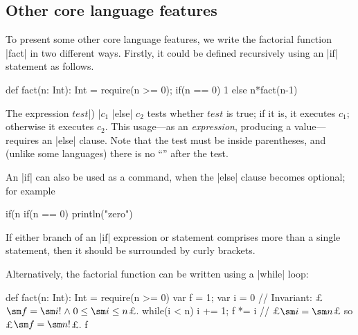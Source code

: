 
\subsection{Other core language features}

To present some other core language features, we write the factorial function
|fact| in two different ways.  Firstly, it could be defined recursively using
an |if| statement as follows.
%
\begin{scala}
  def fact(n: Int): Int = { require(n >= 0); if(n == 0) 1 else n*fact(n-1) }
\end{scala}


The expression
$test$|) |$c_1$ |else| $c_2$
tests whether $test$ is true; if it is, it executes $c_1$; otherwise it
executes $c_2$.
%
This usage---as an \emph{expression}, producing a value---requires an |else|
clause.  Note that the test must be inside parentheses, and (unlike some
languages) there is no ``'' after the test.

An |if| can also be used as a command, when the |else| clause becomes
optional; for example
\begin{scala}
  if(n%
  if(n == 0) println("zero")
\end{scala}


If either branch of an |if| expression or statement comprises more than a
single statement, then it should be surrounded by curly brackets.


Alternatively, the factorial function can be written using a
|while| loop:
%
\begin{scala}
  def fact(n: Int): Int = {
    require(n >= 0)
    var f = 1; var i = 0 // Invariant: £$\sm f = \sm i! \land 0 \le \sm i \le n$£.
    while(i < n){ i += 1; f *= i }
    // £$\sm i = \sm n$£ so £$\sm f = \sm n!$£.
    f
  }
\end{scala}

